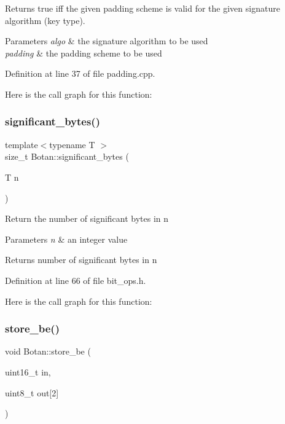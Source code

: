 Returns true iff the given padding scheme is valid for the given signature algorithm (key type).


\begin{DoxyParams}{Parameters}
{\em algo} & the signature algorithm to be used \\
\hline
{\em padding} & the padding scheme to be used \\
\hline
\end{DoxyParams}


Definition at line 37 of file padding.\+cpp.

Here is the call graph for this function\+:
\mbox{\label{namespace_botan_acec63fb9306fc59d57604c157777361d}} 
\subsubsection{\texorpdfstring{significant\+\_\+bytes()}{significant\_bytes()}}
{\footnotesize\ttfamily template$<$typename T $>$ \\
size\+\_\+t Botan\+::significant\+\_\+bytes (\begin{DoxyParamCaption}\item[{T}]{n }\end{DoxyParamCaption})\hspace{0.3cm}{\ttfamily [inline]}}

Return the number of significant bytes in n 
\begin{DoxyParams}{Parameters}
{\em n} & an integer value \\
\hline
\end{DoxyParams}
\begin{DoxyReturn}{Returns}
number of significant bytes in n 
\end{DoxyReturn}


Definition at line 66 of file bit\+\_\+ops.\+h.

Here is the call graph for this function\+:
\mbox{\label{namespace_botan_a26f4a43173adf5f333b598149c3eef1e}} 
\subsubsection{\texorpdfstring{store\+\_\+be()}{store\_be()}\hspace{0.1cm}{\footnotesize\ttfamily [1/6]}}
{\footnotesize\ttfamily void Botan\+::store\+\_\+be (\begin{DoxyParamCaption}\item[{uint16\+\_\+t}]{in,  }\item[{uint8\+\_\+t}]{out\mbox{[}2\mbox{]} }\end{DoxyParamCaption})\hspace{0.3cm}{\ttfamily [inline]}}

